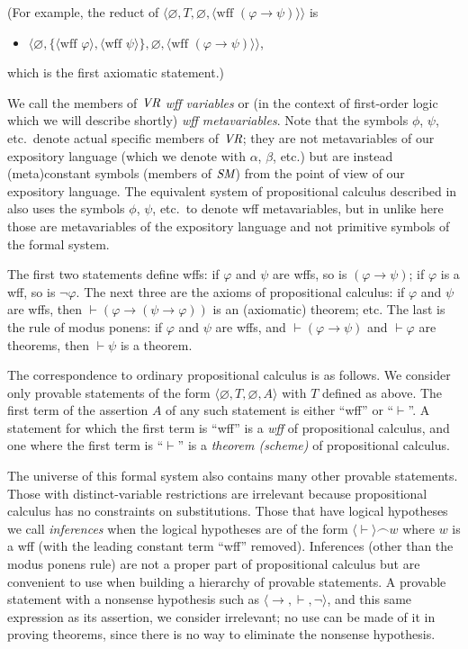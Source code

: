 (For example, the reduct of $\langle\varnothing,T,\varnothing,
               \langle \mbox{wff\ }(\varphi\to\psi)\rangle\rangle$
is
\begin{itemize}
\item[] $\langle\varnothing,
\{\langle \mbox{wff\ } \varphi\rangle,
             \langle \mbox{wff\ } \psi\rangle\},
             \varnothing,
               \langle \mbox{wff\ }(\varphi\to\psi)\rangle\rangle$,
\end{itemize}
which is the first axiomatic statement.)

We call the members of $\mbox{\em VR}$ {\em wff variables} or (in the context
of first-order logic which we will describe shortly) {\em wff metavariables}.
Note that the symbols $\phi$, $\psi$, etc.\ denote actual specific members of
$\mbox{\em VR}$; they are not metavariables of our expository language (which
we denote with $\alpha$, $\beta$, etc.) but are instead (meta)constant symbols
(members of $\mbox{\em SM}$) from the point of view of our expository
language.  The equivalent system of propositional calculus described in
\cite{Tarski1965} also uses the symbols $\phi$, $\psi$, etc.\ to denote wff
metavariables, but in \cite{Tarski1965} unlike here those are metavariables of
the expository language and not primitive symbols of the formal system.

The first two statements define wffs: if $\varphi$ and $\psi$ are wffs, so is
$(\varphi \to \psi)$; if $\varphi$ is a wff, so is $\lnot\varphi$. The next
three are the axioms of propositional calculus: if $\varphi$ and $\psi$ are
wffs, then $\vdash (\varphi \to (\psi \to \varphi))$ is an (axiomatic)
theorem; etc. The
last is the rule of modus ponens: if $\varphi$ and $\psi$ are wffs, and
$\vdash (\varphi\to\psi)$ and $\vdash \varphi$ are theorems, then $\vdash
\psi$ is a theorem.

The correspondence to ordinary propositional calculus is as follows.  We
consider only provable statements of the form $\langle\varnothing,
T,\varnothing,A\rangle$ with $T$ defined as above.  The first term of the
assertion $A$ of any such statement is either ``wff'' or ``$\vdash$''.  A
statement for which the first term is ``wff'' is a {\em wff} of propositional
calculus, and one where the first term is ``$\vdash$'' is a {\em
theorem (scheme)} of propositional calculus.

The universe of this formal system also contains many other provable
statements.  Those with distinct-variable restrictions are irrelevant because
propositional calculus has no constraints on substitutions.  Those that have
logical hypotheses we call {\em inferences} when
the logical hypotheses are of the form
$\langle\vdash\rangle\frown w$ where $w$ is a wff (with the leading constant
term ``wff'' removed).  Inferences (other than the modus ponens rule) are not a
proper part of propositional calculus but are convenient to use when building a
hierarchy of provable statements.  A provable statement with a nonsense
hypothesis such as $\langle \to,\vdash,\lnot\rangle$, and this same expression
as its assertion, we consider irrelevant; no use can be made of it in
proving theorems, since there is no way to eliminate the nonsense hypothesis.

